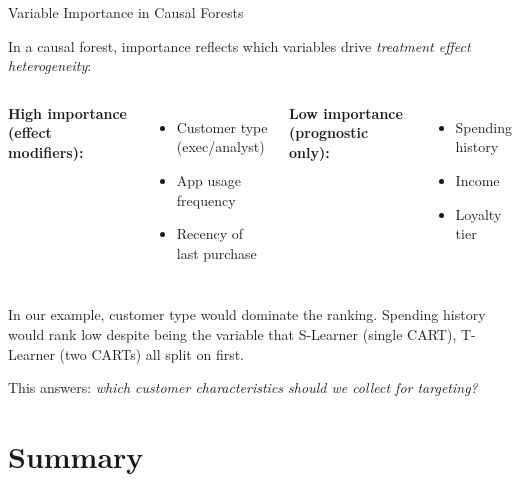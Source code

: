 \documentclass[aspectratio=169, 11pt, handout]{beamer}
\begin{document}
\begin{frame}{Variable Importance in Causal Forests}
 
In a causal forest, importance reflects which variables drive \emph{treatment effect heterogeneity}:
 
\bigskip
 
\begin{columns}
\textbf{High importance (effect modifiers):}
\begin{itemize}
    \item Customer type (exec/analyst)
    \item App usage frequency
    \item Recency of last purchase
\end{itemize}
 
\textbf{Low importance (prognostic only):}
\begin{itemize}
    \item Spending history
    \item Income
    \item Loyalty tier
\end{itemize}
\end{columns}
 
\pause
\bigskip
 
In our example, customer type would dominate the ranking. Spending history would rank low despite being the variable that S-Learner (single CART), T-Learner (two CARTs) all split on first.
 
\medskip
 
This answers: \emph{which customer characteristics should we collect for targeting?}
 
\end{frame}
 
 
\section{Summary}
 
\end{document}
